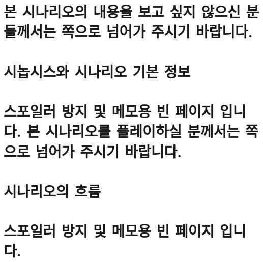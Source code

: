 \documentclass{report}
\begin{document}
	\chapter*{본 시나리오의 내용을 보고 싶지 않으신 분들께서는 \pageref{endof_Poison}쪽으로 넘어가 주시기 바랍니다.}
	
	\chapter{시놉시스와 시나리오 기본 정보}
		
	
	\chapter*{스포일러 방지 및 메모용 빈 페이지 입니다. 본 시나리오를 플레이하실 분께서는 \pageref{endof_Poison}쪽으로 넘어가 주시기 바랍니다.}
	
	\parttoc
	
	\chapter{시나리오의 흐름}
		
		
	\chapter*{스포일러 방지 및 메모용 빈 페이지 입니다.}
\end{document}
